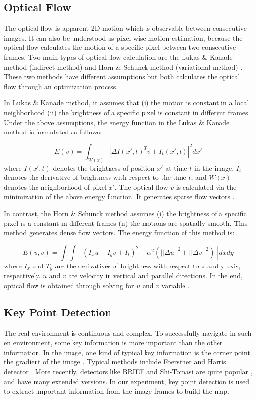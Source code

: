 \documentclass{easychair}
\begin{document}
\subsection{Optical Flow} The optical flow is apparent 2D motion which is observable between consecutive images. It can also be understood as pixel-wise motion estimation, because the optical flow calculates the motion of a specific pixel between two consecutive frames. Two main types of optical flow calculation are the Lukas \& Kanade method (indirect method) and Horn \& Schunck method (variational method) \cite{lukas} \cite{horn}. These two methods have different assumptions but both calculates the optical flow through an optimization process.

In Lukas \& Kanade method, it assumes that (i) the motion is constant in a local neighborhood (ii) the brightness of a specific pixel is constant in different frames. Under the above assumptions, the energy function in the Lukas \& Kanade method is formulated as follows:

\begin{equation}
E(v) = \int_{W(x)} |\Delta I(x', t)^Tv + I_t(x',t) |^2dx'
\end{equation}
\noindent
where $I(x',t)$ denotes the brightness of position $x'$ at time $t$ in the image, $I_t$ denotes the derivative of brightness with respect to the time $t$, and $W(x)$ denotes the neighborhood of pixel $x'$. The optical flow $v$ is calculated via the minimization of the above energy function. It generates sparse flow vectors \cite{lukas}.

In contrast, the Horn \& Schunck method assumes (i) the brightness of a specific pixel is a constant in different frames (ii) the motions are spatially smooth. This method generates dense flow vectors. The energy function of this method is:

\begin{equation}
E(u,v) = \int\int[(I_xu + I_yv + I_t)^2+\alpha^2(||\Delta u ||^2 + ||\Delta v ||^2)]dxdy
\end{equation} 
\noindent
where $I_x$ and $T_y$ are the derivatives of brightness with respect to x and y axis, respectively. $u$ and $v$ are velocity in vertical and parallel directions. In the end, optical flow is obtained through solving for $u$ and $v$ variable \cite{horn}.		

\subsection{Key Point Detection}
The real environment is continuous and complex. To successfully navigate in such en environment, some key information is more important than the other information. In the image, one kind of typical key information is the corner point. the gradient of the image \cite{gradient}. Typical methods include Foerstner and Harris detector \cite{detector}. More recently, detectors like BRIEF and Shi-Tomasi are quite popular \cite{brief} \cite{shitomasi}, and have many extended versions. In our experiment, key point detection is used to extract important information from the image frames to build the map.
\end{document}
